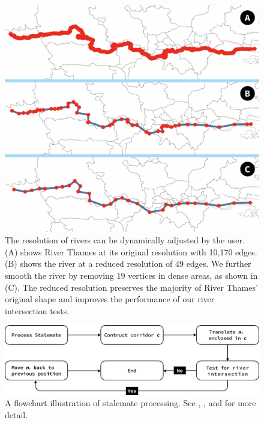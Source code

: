  {
  \begin{figure}[tb!]
      \centering
      \includegraphics[width=0.7\columnwidth,keepaspectratio]{figure/river_resolution.png}
      \caption{The resolution of rivers can be dynamically adjusted by the user. (A) shows River Thames at its original resolution with 10,170 edges. (B) shows the river at a reduced resolution of 49 edges. We further smooth the river by removing 19 vertices in dense areas, as shown in (C). The reduced resolution preserves the majority of River Thames' original shape and improves the performance of our river intersection tests.}
      \label{fig:river resolution}
  \end{figure}
 }

 {
  \begin{figure}[tb!]
      \centering
      \includegraphics[width=\columnwidth,keepaspectratio]{figure/flowchart stalemate.png}
      \caption{A flowchart illustration of stalemate processing. See , , and  for more detail.}
      \label{fig:flowchart-stalemate}
  \end{figure}
 }

